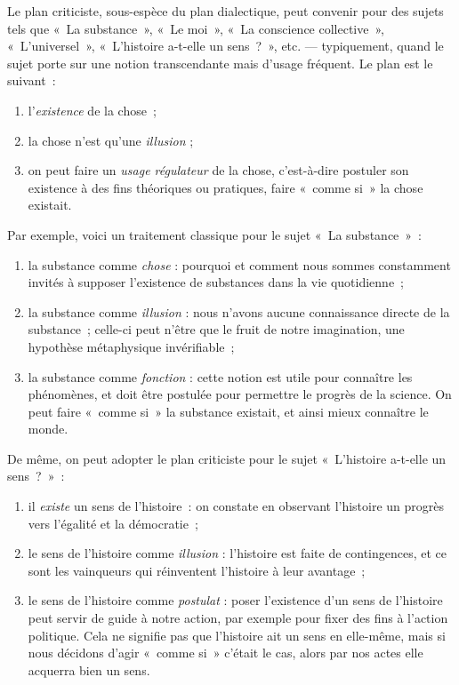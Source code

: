 \documentclass[a4paper]{article}
\begin{document}
Le plan criticiste, sous-espèce du plan dialectique, peut convenir pour
des sujets tels que « La substance », « Le moi », « La conscience
collective », « L'universel », « L'histoire a-t-elle un sens ? », etc. ---
typiquement, quand le sujet porte sur une notion transcendante mais
d'usage fréquent. Le plan est le suivant :

\begin{enumerate}
\item l'\emph{existence} de la chose ;
\item la chose n'est qu'une \emph{illusion} ;
\item on peut faire un \emph{usage régulateur} de la chose, c'est-à-dire
   postuler son existence à des fins théoriques ou pratiques, faire
   « comme si » la chose existait.
\end{enumerate}

Par exemple, voici un traitement classique pour le sujet « La
substance » :

\begin{enumerate}
\item la substance comme \emph{chose} : pourquoi et comment nous sommes
   constamment invités à supposer l'existence de substances dans la vie
   quotidienne ;
\item la substance comme \emph{illusion} : nous n'avons aucune connaissance
   directe de la substance ; celle-ci peut n'être que le fruit de notre
   imagination, une hypothèse métaphysique invérifiable ;
\item la substance comme \emph{fonction} : cette notion est utile pour connaître
   les phénomènes, et doit être postulée pour permettre le progrès de la
   science. On peut faire « comme si » la substance existait, et ainsi
   mieux connaître le monde.
\end{enumerate}

De même, on peut adopter le plan criticiste pour le sujet « L'histoire
a-t-elle un sens ? » :

\begin{enumerate}
\item il \emph{existe} un sens de l'histoire : on constate en observant
   l'histoire un progrès vers l'égalité et la démocratie ;
\item le sens de l'histoire comme \emph{illusion} : l'histoire est faite de
   contingences, et ce sont les vainqueurs qui réinventent l'histoire à
   leur avantage ;
\item le sens de l'histoire comme \emph{postulat} : poser l'existence d'un sens
   de l'histoire peut servir de guide à notre action, par exemple pour
   fixer des fins à l'action politique. Cela ne signifie pas que
   l'histoire ait un sens en elle-même, mais si nous décidons d'agir
   « comme si » c'était le cas, alors par nos actes elle acquerra bien un
   sens.
\end{enumerate}
\end{document}

